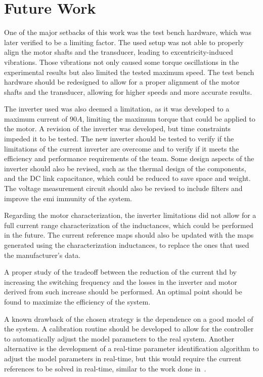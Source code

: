 \section{Future Work}
\label{section:future}

One of the major setbacks of this work was the test bench hardware, which was later verified to be a limiting factor. The used setup was not able to properly align the motor shafts and the transducer, leading to excentricity-induced vibrations. Those vibrations not only caused some torque oscillations in the experimental results but also limited the tested maximum speed. The test bench hardware should be redesigned to allow for a proper alignment of the motor shafts and the transducer, allowing for higher speeds and more accurate results.

The inverter used was also deemed a limitation, as it was developed to a maximum current of $90A$, limiting the maximum torque that could be applied to the motor. A revision of the inverter was developed, but time constraints impeded it to be tested. The new inverter should be tested to verify if the limitations of the current inverter are overcome and to verify if it meets the efficiency and performance requirements of the team. Some design aspects of the inverter should also be revised, such as the thermal design of the components, and the DC link capacitance, which could be reduced to save space and weight. The voltage measurement circuit should also be revised to include filters and improve the \gls{emi} immunity of the system. 

Regarding the motor characterization, the inverter limitations did not allow for a full current range characterization of the inductances, which could be performed in the future. The current reference maps should also be updated with the maps generated using the characterization inductances, to replace the ones that used the manufacturer's data. 

A proper study of the tradeoff between the reduction of the current \gls{thd} by increasing the switching frequency and the losses in the inverter and motor derived from such increase should be performed. An optimal point should be found to maximize the efficiency of the system.

A known drawback of the chosen strategy is the dependence on a good model of the system. A calibration routine should be developed to allow for the controller to automatically adjust the model parameters to the real system. Another alternative is the development of a real-time parameter identification algorithm to adjust the model parameters in real-time, but this would require the current references to be solved in real-time, similar to the work done in~\cite{Jung:Online_MTPA_Ferrari:2013}.

